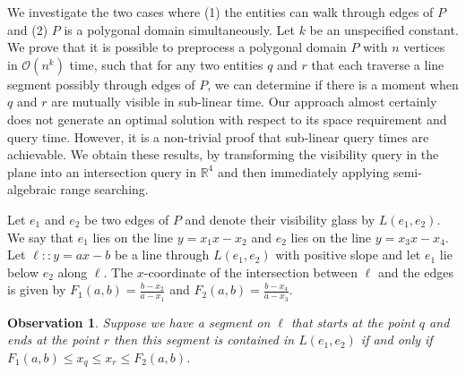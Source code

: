 \documentclass[UKenglish]{lipics-v2019}
\newtheorem{observation}{Observation}
\begin{document}
We investigate the two cases where (1) the entities can walk through edges of $P$ and (2) $P$ is a polygonal domain simultaneously. Let $k$ be an unspecified constant. We prove that it is possible to preprocess a polygonal domain $P$ with $n$ vertices in $\mathcal{O}(n^k)$ time, such that for any two entities $q$ and $r$ that each traverse a line segment possibly through edges of $P$, we can determine if there is a moment when $q$ and $r$ are mutually visible in sub-linear time. Our approach almost certainly does not generate an optimal solution with respect to its space requirement and query time. However, it is a non-trivial proof that sub-linear query times are achievable. We obtain these results, by transforming the visibility query in the plane into an intersection query in $\mathbb{R}^4$ and then immediately applying semi-algebraic range searching. 



Let $e_1$ and $e_2$ be two edges of $P$ and denote their visibility glass by $L(e_1, e_2)$. We say that $e_1$ lies on the line $y = x_1 x - x_2$ and $e_2$ lies on the line $y = x_3 x - x_4$. Let $\ell :: y = ax - b$ be a line through $L(e_1, e_2)$ with positive slope and let $e_1$ lie below $e_2$ along $\ell$. The $x$-coordinate of the intersection between $\ell$ and the edges is given by $F_1(a,b) = \frac{b-x_2}{a - x_1}$ and $F_2(a,b) = \frac{b - x_4}{a - x_3}$.

\begin{observation}
Suppose we have a segment on $\ell$ that starts at the point $q$ and ends at the point $r$ then this segment is contained in $L(e_1, e_2)$ if and only if $F_1(a,b) \le x_{q} \le x_{r} \le F_2(a,b)$.
\end{observation}
\end{document}
